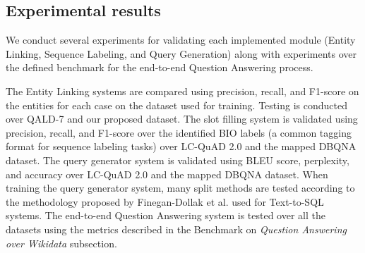 \subsection*{Experimental results}
We conduct several experiments for validating each implemented module (Entity Linking, 
Sequence Labeling, and Query Generation) along with experiments over the defined 
benchmark for the end-to-end Question Answering process.

The Entity Linking systems are compared using precision, recall, and F1-score on the 
entities for each case on the dataset used for training. Testing is conducted over QALD-7 and 
our proposed dataset. The slot filling system is validated using precision, recall, and F1-score 
over the identified BIO labels (a common tagging format for sequence labeling tasks) over 
LC-QuAD 2.0 and the mapped DBQNA dataset. The query generator system is validated 
using BLEU score, perplexity, and accuracy over LC-QuAD 2.0 and the mapped DBQNA 
dataset. When training the query generator system, many split methods are tested according 
to the methodology proposed by Finegan-Dollak et al. \cite{semPar:txt-to-sql-RadevKZZFRS18} used for Text-to-SQL systems. 
The end-to-end Question Answering system is tested over all the datasets using the metrics 
described in the Benchmark on \textit{Question Answering over Wikidata} subsection.